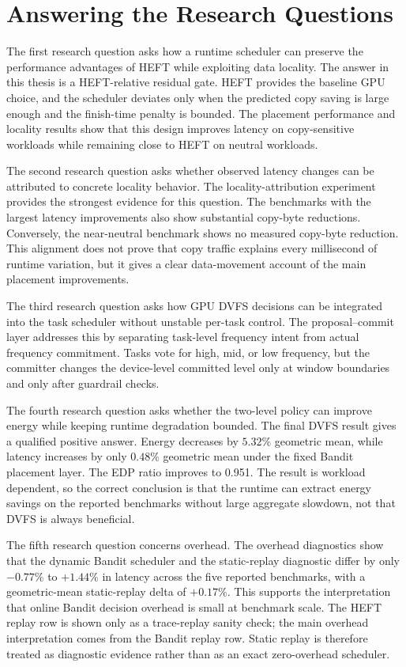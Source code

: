 \section{Answering the Research Questions}
\label{sec:discussion-research-questions}

The first research question asks how a \CUDASTF{} runtime scheduler can preserve
the performance advantages of HEFT while exploiting data locality. The answer
in this thesis is a HEFT-relative residual gate. HEFT provides the baseline GPU
choice, and the scheduler deviates only when the predicted copy saving is large
enough and the finish-time penalty is bounded. The placement performance and
locality results show that this design improves latency on copy-sensitive
workloads while remaining close to HEFT on neutral workloads.

The second research question asks whether observed latency changes can be
attributed to concrete locality behavior. The locality-attribution experiment
provides the strongest evidence for this question. The benchmarks with the
largest latency improvements also show substantial copy-byte reductions.
Conversely, the near-neutral benchmark shows no measured copy-byte reduction.
This alignment does not prove that copy traffic explains every millisecond of
runtime variation, but it gives a clear data-movement account of the main
placement improvements.

The third research question asks how GPU DVFS decisions can be integrated into
the task scheduler without unstable per-task control. The proposal--commit
layer addresses this by separating task-level frequency intent from actual
frequency commitment. Tasks vote for high, mid, or low frequency, but the
committer changes the device-level committed level only at window boundaries
and only after guardrail checks.

The fourth research question asks whether the two-level policy can improve
energy while keeping runtime degradation bounded. The final DVFS result gives
a qualified positive answer. Energy decreases by \(5.32\%\) geometric mean,
while latency increases by only \(0.48\%\) geometric mean under the fixed
Bandit placement layer. The EDP ratio improves to 0.951. The result is
workload dependent, so the correct conclusion is that the runtime can extract
energy savings on the reported benchmarks without large aggregate slowdown, not
that DVFS is always beneficial.

The fifth research question concerns overhead. The overhead diagnostics show
that the dynamic Bandit scheduler and the static-replay diagnostic differ by
only \(-0.77\%\) to \(+1.44\%\) in latency across the five reported
benchmarks, with a geometric-mean static-replay delta of \(+0.17\%\). This
supports the interpretation that online Bandit decision overhead is small at
benchmark scale. The HEFT replay row is shown only as a trace-replay sanity
check; the main overhead interpretation comes from the Bandit replay row.
Static replay is therefore treated as diagnostic evidence rather than as an
exact zero-overhead scheduler.

